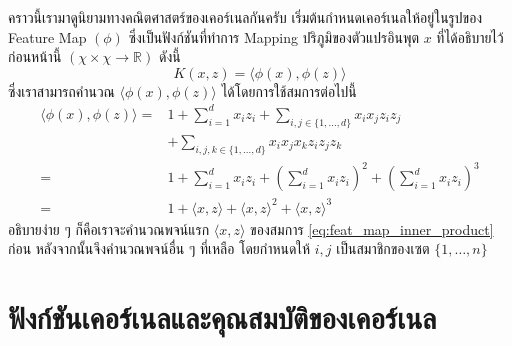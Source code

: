 คราวนี้เรามาดูนิยามทางคณิตศาสตร์ของเคอร์เนลกันครับ เริ่มต้นกำหนดเคอร์เนลให้อยู่ในรูปของ Feature Map $(\phi)$ ซึ่งเป็นฟังก์ชันที่ทำการ Mapping ปริภูมิของตัวแปรอินพุต $x$ ที่ได้อธิบายไว้ก่อนหน้านี้ $(\chi \times \chi \rightarrow \mathbb{R})$ ดังนี้
%
\begin{equation}\label{eq:kernel}
    K(x,z) = \langle\phi(x),\phi(z)\rangle
\end{equation}
%
\noindent ซึ่งเราสามารถคำนวณ $\langle\phi(x),\phi(z)\rangle$ ได้โดยการใช้สมการต่อไปนี้
%
\begin{align}
    \langle\phi(x),\phi(z)\rangle = & 1 + \sum_{i=1}^d x_i z_i +
    \sum_{i,j\in\{1,\ldots,d\}} x_i x_j z_i z_j \nonumber \\
                                    & + \sum_{i,j,k \in \{1,\ldots,d\}} x_i x_j x_k z_i z_j z_k \\
    =                               & 1 + \sum_{i=1}^d x_i z_i + \left(\sum_{i=1}^d x_i z_i \right)^2 + \left( \sum_{i=1}^d x_i z_i \right)^3  \\
    =                               & 1 + \langle x,z \rangle + \langle x,z \rangle^2 + \langle x,z \rangle^3\label{eq:feat_map_inner_product}
\end{align}
%
\noindent อธิบายง่าย ๆ ก็คือเราจะคำนวณพจน์แรก $\langle x,z \rangle$ ของสมการ \eqref{eq:feat_map_inner_product} ก่อน
หลังจากนั้นจึงคำนวณพจน์อื่น ๆ ที่เหลือ โดยกำหนดให้ $i,j$ เป็นสมาชิกของเซต $\{1, \dots, n\}$

\section{ฟังก์ชันเคอร์เนลและคุณสมบัติของเคอร์เนล}
\label{sec:func_kernel}

